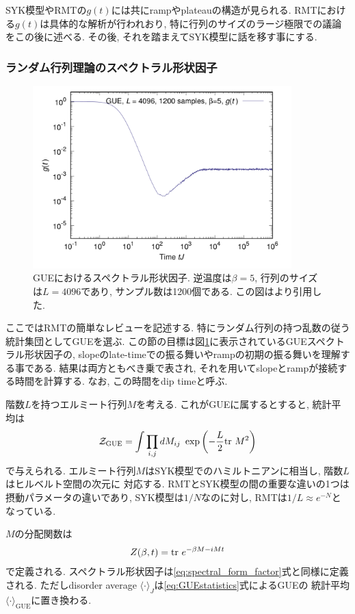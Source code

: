SYK模型やRMTの$g(t)$には共にrampやplateauの構造が見られる. 
RMTにおける$g(t)$は具体的な解析が行われおり, 特に行列のサイズのラージ極限での議論をこの後に述べる. 
その後, それを踏まえてSYK模型に話を移す事にする. 

\subsubsection{ランダム行列理論のスペクトラル形状因子}
\begin{figure}[ht]
	\centering
	\includegraphics[width=10cm]{figures/spectralformfactor_inRMT}
	\caption{GUEにおけるスペクトラル形状因子. 逆温度は$\beta=5$, 行列のサイズは$L=4096$であり, 
		サンプル数は1200個である. この図は\cite{polchinski_chaos}より引用した. 
	}
	\label{fig:spectralformfactor_inRMT}
\end{figure}
ここではRMTの簡単なレビューを記述する. 
特にランダム行列の持つ乱数の従う統計集団としてGUEを選ぶ. 
この節の目標は図\ref{fig:spectralformfactor_inRMT}に表示されているGUEスペクトラル形状因子の, 
slopeのlate-timeでの振る舞いやrampの初期の振る舞いを理解する事である. 
結果は両方ともべき乗で表され, それを用いてslopeとrampが接続する時間を計算する. 
なお, この時間をdip timeと呼ぶ. 

階数$L$を持つエルミート行列$M$を考える. 
これがGUEに属するとすると, 統計平均は
\begin{align}
	\mathcal{Z}_{\mathrm{GUE}} = \int \prod_{i, j} dM_{ij}\ \exp\left(
		-\frac{L}{2}\mathrm{tr}\ M^2
	\right)
	\label{eq:GUEstatistics}
\end{align}
で与えられる. 
エルミート行列$M$はSYK模型でのハミルトニアンに相当し, 階数$L$はヒルベルト空間の次元に
対応する. 
RMTとSYK模型の間の重要な違いの1つは摂動パラメータの違いであり, SYK模型は$1/N$なのに対し, 
RMTは$1/L \approx e^{-N}$となっている.

$M$の分配関数は
\begin{align}
	Z(\beta, t) = \mathrm{tr}\ e^{-\beta M - iMt}
	\label{eq:GUEpartition_function}
\end{align}
で定義される. 
スペクトラル形状因子は\eqref{eq:spectral_form_factor}式と同様に定義される. 
ただしdisorder average $\langle \cdot\rangle_J$は\eqref{eq:GUEstatistics}式によるGUEの
統計平均$\langle\cdot\rangle_{\mathrm{GUE}}$に置き換わる. 

